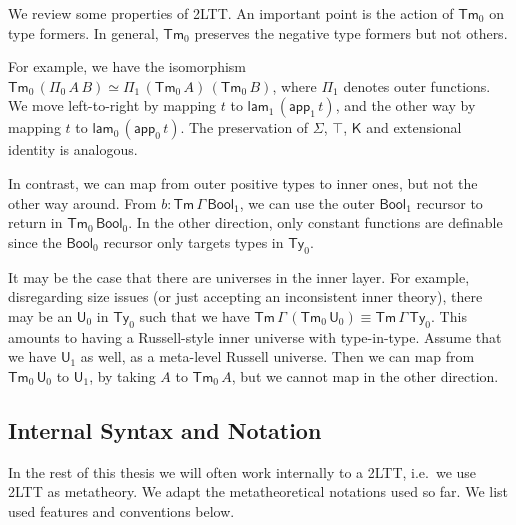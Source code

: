 \documentclass[12pt,a4paper,twoside,openany]{book}
\theoremstyle{remark}
\theoremstyle{definition}
\theoremstyle{theorem}
\newcommand{\ms}[1]{\mathsf{#1}}
\newcommand{\Tm}{\mathsf{Tm}}
\newcommand{\Ty}{\mathsf{Ty}}
\newcommand{\U}{\mathsf{U}}
\newcommand{\K}{\mathsf{K}}
\newcommand{\app}{\ms{app}}
\newcommand{\Bool}{\ms{Bool}}
\newcommand{\lam}{\ms{lam}}
\begin{document}
We review some properties of 2LTT. An important point is the action of $\Tm_0$
on type formers. In general, $\Tm_0$ preserves the negative type formers but not
others.

For example, we have the isomorphism $\Tm_0\,(\Pi_0\,A\,B) \simeq
\Pi_1\,(\Tm_0\,A)\,(\Tm_0\,B)$, where $\Pi_1$ denotes outer functions.  We move
left-to-right by mapping $t$ to $\lam_1\,(\app_1\,t)$, and the other way by
mapping $t$ to $\lam_0\,(\app_0\,t)$. The preservation of $\Sigma$, $\top$, $\K$
and extensional identity is analogous.

In contrast, we can map from outer positive types to inner ones, but not the
other way around. From $b : \Tm\,\Gamma\,\Bool_1$, we can use the outer
$\Bool_1$ recursor to return in $\Tm_0\,\Bool_0$. In the other direction, only
constant functions are definable since the $\Bool_0$ recursor only targets types
in $\Ty_0$.

It may be the case that there are universes in the inner layer. For example,
disregarding size issues (or just accepting an inconsistent inner theory), there
may be an $\U_0$ in $\Ty_0$ such that we have $\Tm\,\Gamma\,(\Tm_0\,\U_0) \equiv
\Tm\,\Gamma\,\Ty_0$. This amounts to having a Russell-style inner universe with
type-in-type. Assume that we have $\U_1$ as well, as a meta-level Russell
universe. Then we can map from $\Tm_0\,\U_0$ to $\U_1$, by taking $A$ to
$\Tm_0\,A$, but we cannot map in the other direction.

\subsection{Internal Syntax and Notation}
\label{sec:2ltt-internal-syntax}

In the rest of this thesis we will often work internally to a 2LTT, i.e.\ we use
2LTT as metatheory. We adapt the metatheoretical notations used so far. We list
used features and conventions below.
\end{document}
